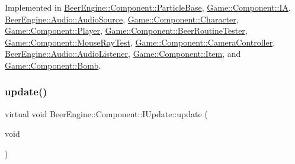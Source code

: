 Implemented in \mbox{\hyperlink{class_beer_engine_1_1_component_1_1_particle_base_a17d41a2cdf9174d5f86a6773c40e4d28}{Beer\+Engine\+::\+Component\+::\+Particle\+Base}}, \mbox{\hyperlink{class_game_1_1_component_1_1_i_a_a72b1e3aaf4686e0abef2e147d48f50e9}{Game\+::\+Component\+::\+IA}}, \mbox{\hyperlink{class_beer_engine_1_1_audio_1_1_audio_source_a248900a46e559e0e085b2cb98a766cf2}{Beer\+Engine\+::\+Audio\+::\+Audio\+Source}}, \mbox{\hyperlink{class_game_1_1_component_1_1_character_a19848759fb1837ca8dfeb2f10266fe9d}{Game\+::\+Component\+::\+Character}}, \mbox{\hyperlink{class_game_1_1_component_1_1_player_aacbb2bc974b4b81434abd49eb8f91999}{Game\+::\+Component\+::\+Player}}, \mbox{\hyperlink{class_game_1_1_component_1_1_beer_routine_tester_a01abf9a71d6c3598a3c9a8c0d26c1615}{Game\+::\+Component\+::\+Beer\+Routine\+Tester}}, \mbox{\hyperlink{class_game_1_1_component_1_1_mouse_ray_test_a71fe0d523b05a8d42c7c79101ea5ad18}{Game\+::\+Component\+::\+Mouse\+Ray\+Test}}, \mbox{\hyperlink{class_game_1_1_component_1_1_camera_controller_a0bdce3356bde07f277e0c58409c1f55d}{Game\+::\+Component\+::\+Camera\+Controller}}, \mbox{\hyperlink{class_beer_engine_1_1_audio_1_1_audio_listener_ad3d6b34a33582c17e2c7bc250e4e6937}{Beer\+Engine\+::\+Audio\+::\+Audio\+Listener}}, \mbox{\hyperlink{class_game_1_1_component_1_1_item_a3402bfd1509d12eb16fadbc37222406d}{Game\+::\+Component\+::\+Item}}, and \mbox{\hyperlink{class_game_1_1_component_1_1_bomb_af6598c095c2f36a2a1b1048eb84d6fc7}{Game\+::\+Component\+::\+Bomb}}.

\mbox{\label{class_beer_engine_1_1_component_1_1_i_update_aeeda0aa303175720e449b4c51d9867dd}} 
\subsubsection{\texorpdfstring{update()}{update()}}
{\footnotesize\ttfamily virtual void Beer\+Engine\+::\+Component\+::\+I\+Update\+::update (\begin{DoxyParamCaption}\item[{void}]{ }\end{DoxyParamCaption})\hspace{0.3cm}{\ttfamily [pure virtual]}}



